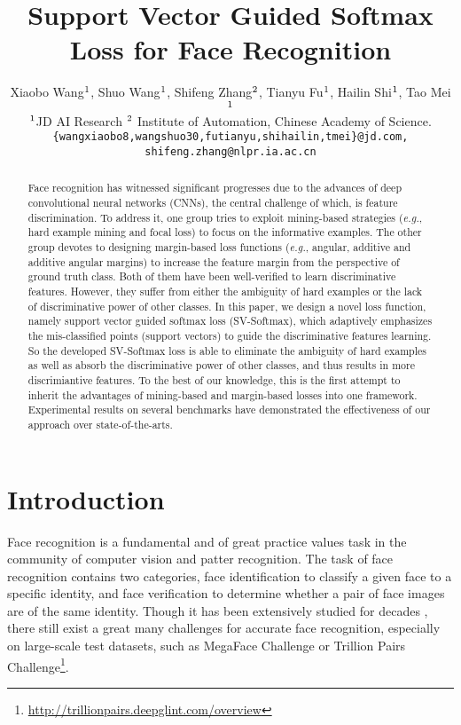 \documentclass[10pt,twocolumn,letterpaper]{article}
\begin{document}
\title{Support Vector Guided Softmax Loss for Face Recognition}
\author{Xiaobo Wang$^{\rm{ 1}}$, Shuo Wang$^{\rm{ 1}}$, Shifeng Zhang$^{\rm{ 2}}$, Tianyu Fu$^{\rm{ 1}}$, Hailin Shi$^{\rm{1}}$, Tao Mei$^{\rm{ 1}}$\\
{$^{\rm 1}$JD AI Research
$^{\rm 2}$ Institute of Automation, Chinese Academy of Science. }\\
{\tt\small \{wangxiaobo8,wangshuo30,futianyu,shihailin,tmei\}@jd.com, shifeng.zhang@nlpr.ia.ac.cn}
}

\maketitle


\begin{abstract}
   Face recognition has witnessed significant progresses due to the advances of deep convolutional neural networks (CNNs), the central challenge of which, is feature discrimination. To address it, one group tries to exploit mining-based strategies (\textit{e.g.}, hard example mining and focal loss) to focus on the informative examples. The other group devotes to designing margin-based loss functions (\textit{e.g.}, angular, additive and additive angular margins) to increase the feature margin from the perspective of ground truth class. Both of them have been well-verified to learn discriminative features. However, they suffer from either the ambiguity of hard examples or the lack of discriminative power of other classes. In this paper, we design a novel loss function, namely support vector guided softmax loss (SV-Softmax), which adaptively emphasizes the mis-classified points (support vectors) to guide the discriminative features learning. So the developed SV-Softmax loss is able to eliminate the ambiguity of hard examples as well as absorb the discriminative power of other classes, and thus results in more discrimiantive features. To the best of our knowledge, this is the first attempt to inherit the advantages of mining-based and margin-based losses into one framework. Experimental results on several benchmarks have demonstrated the effectiveness of our approach over state-of-the-arts.
\end{abstract}

\section{Introduction}
Face recognition is a fundamental and of great practice values task in the community of computer vision and patter recognition. The task of face recognition contains two categories, face identification to classify a given face to a specific identity, and face verification to determine whether a pair of face images are of the same identity.
Though it has been extensively studied for decades \cite{wright2009robust,cai2014support,USSDL,DeepID,DeepID2+,shi2017cross}, there still exist a great many challenges for accurate face recognition, especially on large-scale test datasets, such as MegaFace Challenge \cite{megaface_1} or Trillion Pairs Challenge\footnote{\url{http://trillionpairs.deepglint.com/overview}}.
\end{document}
